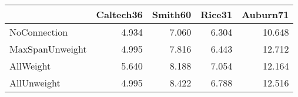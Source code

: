 \begin{tabular}{lrrrr}
\toprule
{} & Caltech36 & Smith60 & Rice31 & Auburn71 \\
\midrule
NoConnection    &     4.934 &   7.060 &  6.304 &   10.648 \\
MaxSpanUnweight &     4.995 &   7.816 &  6.443 &   12.712 \\
AllWeight       &     5.640 &   8.188 &  7.054 &   12.164 \\
AllUnweight     &     4.995 &   8.422 &  6.788 &   12.516 \\
\bottomrule
\end{tabular}
